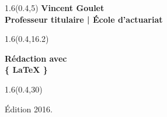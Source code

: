 \begingroup

\textblockorigin{0mm}{0mm}
\begin{frame}[plain]
  \begin{textblock*}{1.6\TPHorizModule}(0.4\TPHorizModule,5\TPVertModule)
    \titles\bfseries
    \fontsize{10}{11}\selectfont
    Vincent Goulet \\
    \mdseries
    \fontsize{9}{11}\selectfont
    Professeur titulaire | École d'actuariat
  \end{textblock*}

  \begin{textblock*}{1.6\TPHorizModule}(0.4\TPHorizModule,16.2\TPVertModule)
    \raggedright%
    \titles\bfseries
    \fontsize{20}{20}\selectfont
    Rédaction avec \\
    \rmfamily\mdseries
    \fontsize{22.5}{22.5}\selectfont
    \fontsize{40}{40}\selectfont%
    \{%
    \fontsize{35}{35}\selectfont%
    \LaTeX
    \fontsize{40}{40}\selectfont%
    \}
  \end{textblock*}

  \begin{textblock*}{1.6\TPHorizModule}(0.4\TPHorizModule,30\TPVertModule)
    \begin{minipage}{\textwidth}
      \fontsize{9}{11}\selectfont
      Édition 2016.{}
    \end{minipage}
  \end{textblock*}
\end{frame}
\endgroup

